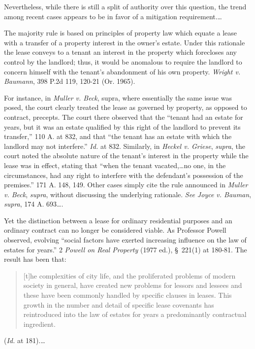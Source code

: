 Nevertheless, while there is still a split of authority over this question, the
trend among recent cases appears to be in favor of a mitigation
requirement.\ldots

The majority rule is based on principles of property law which equate a lease
with a transfer of a property interest in the owner's estate. Under this
rationale the lease conveys to a tenant an interest in the property which
forecloses any control by the landlord; thus, it would be anomalous to require
the landlord to concern himself with the tenant's abandonment of his own
property. \textit{Wright v. Baumann}, 398 P.2d 119, 120-21 (Or. 1965).

For instance, in \textit{Muller v. Beck}, supra, where essentially the same
issue was posed, the court clearly treated the lease as governed by property,
as opposed to contract, precepts. The court there observed that the ``tenant
had an estate for years, but it was an estate qualified by this right of the
landlord to prevent its transfer,'' 110 A. at 832, and that ``the tenant has an
estate with which the landlord may not interfere.'' \textit{Id.} at 832.
Similarly, in \textit{Heckel v. Griese}, \textit{supra}, the court noted the
absolute nature of the tenant's interest in the property while the lease was in
effect, stating that ``when the tenant vacated,\ldots no one, in the
circumstances, had any right to interfere with the defendant's possession of
the premises.'' 171 A. 148, 149. Other cases simply cite the rule announced in
\textit{Muller v. Beck}, \textit{supra}, without discussing the underlying
rationale. \textit{See Joyce v. Bauman}, \textit{supra}, 174 A. 693\ldots.

Yet the distinction between a lease for ordinary residential purposes and an
ordinary contract can no longer be considered viable. As Professor Powell
observed, evolving ``social factors have exerted increasing influence on the
law of estates for years.'' 2 \textit{Powell on Real Property} (1977 ed.),
\S~221(1) at 180-81. The result has been that:
\begin{quote}
[t]he complexities of city life, and the proliferated problems of modern society
in general, have created new problems for lessors and lessees and these have
been commonly handled by specific clauses in leases. This growth in the number
and detail of specific lease covenants has reintroduced into the law of estates
for years a predominantly contractual ingredient. 
\end{quote}
(\textit{Id.} at 181).\ldots

